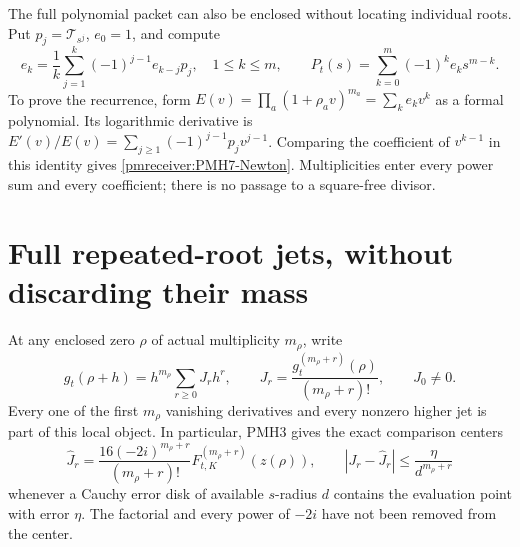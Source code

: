 The full polynomial packet can also be enclosed without locating
individual roots. Put $p_j=\mathscr T_{s^j}$, $e_0=1$, and compute
\begin{equation}\label{pmreceiver:PMH7-Newton}
 e_k=\frac1k\sum_{j=1}^k(-1)^{j-1}e_{k-j}p_j,
 \quad 1\le k\le m,\qquad
 P_t(s)=\sum_{k=0}^m(-1)^ke_ks^{m-k}.
\end{equation}
To prove the recurrence, form
$E(v)=\prod_a(1+\rho_av)^{m_a}=\sum_ke_kv^k$ as a formal
polynomial. Its logarithmic derivative is
$E'(v)/E(v)=\sum_{j\ge1}(-1)^{j-1}p_jv^{j-1}$.
Comparing the coefficient of $v^{k-1}$ in this identity gives
\eqref{pmreceiver:PMH7-Newton}. Multiplicities enter every power sum and every
coefficient; there is no passage to a square-free divisor.

\section{Full repeated-root jets, without discarding their mass}

At any enclosed zero $\rho$ of actual multiplicity $m_\rho$, write
\begin{equation}\label{pmreceiver:PMH8-local}
 g_t(\rho+h)=h^{m_\rho}\sum_{r\ge0}J_rh^r,
 \qquad J_r=\frac{g_t^{(m_\rho+r)}(\rho)}{(m_\rho+r)!},
 \qquad J_0\ne0.
\end{equation}
Every one of the first $m_\rho$ vanishing derivatives and every
nonzero higher jet is part of this local object. In particular,
PMH3 gives the exact comparison centers
\begin{equation}\label{pmreceiver:PMH8-jets}
 \widehat J_r=
 \frac{16(-2i)^{m_\rho+r}}{(m_\rho+r)!}
 F_{t,K}^{(m_\rho+r)}(z(\rho)),\qquad
 |J_r-\widehat J_r|\le\frac{\eta}{d^{m_\rho+r}}
\end{equation}
whenever a Cauchy error disk of available $s$-radius $d$ contains
the evaluation point with error $\eta$. The factorial and every
power of $-2i$ have not been removed from the center.

